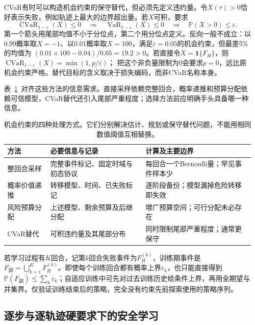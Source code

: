 CVaR有时可以构造机会约束的保守替代，但必须先定义违约量。令$X(\tau)>0$恰好表示失败，例如轨迹上最大的边界超出量。若$X$可积，要求
\[
  \operatorname{CVaR}_{1-\varepsilon}(X)\leq0
  \quad\Longrightarrow\quad
  \operatorname{VaR}_{1-\varepsilon}(X)\leq0
  \quad\Longrightarrow\quad
  \mathbb P(X>0)\leq\varepsilon.
\]
第一个箭头用尾部均值不小于分位点，第二个用分位点定义。反向一般不成立：以0.99概率取$X=-1$、以0.01概率取$X=100$，满足$\varepsilon=0.05$的机会约束，但最差5\%的均值为
$(0.01\times100-0.04)/0.05=19.2>0$。若直接令$X=\mathbf1\{F_H\}$，则
$\operatorname{CVaR}_{1-\varepsilon}(X)=\min(1,p/\varepsilon)$；
把这个非负量限制为0会要求$p=0$，远比原机会约束严格。替代目标的含义取决于损失编码，而非CVaR名称本身。

表~\ref{tab:rl-trustworthy-chance-methods}~对齐这些方法的信息需求。直接采样依赖完整回合，概率递推和预算分配依赖可信模型，CVaR替代还引入尾部严重程度；选择方法前应明确手头具备哪一种信息。

\begin{table}[htbp]
  \centering
  \begin{tabularx}{\linewidth}{@{}>{\raggedright\arraybackslash}p{21mm}XX@{}}
    \toprule
    方法 & 必要信息与记录 & 计算及主要边界 \\
    \midrule
    整回合采样 & 完整事件标记、固定时域与初态协议 & 每回合一个Bernoulli量；罕见事件样本少 \\
    概率价值递推 & 转移模型、时间、已失败标记 & 逐阶段备份；模型漏掉危险转移即失效 \\
    风险预算分配 & 上述模型、剩余预算及后继分配 & 增广预算空间；可行分配未必存在 \\
    CVaR替代 & 可积违约量及其尾部分布 & 同时限制尾部严重程度；通常更保守 \\
    \bottomrule
  \end{tabularx}
  \caption{机会约束的四种处理方式。它们分别解决估计、规划或保守替代问题，不能用相同数值阈值互相替换。}
  \label{tab:rl-trustworthy-chance-methods}
\end{table}

若学习过程有$K$回合，记第$k$回合失败事件为$F_H^{(k)}$，训练期事件是
$F_{\text{训}}=\bigcup_{k=1}^KF_H^{(k)}$。即使每个训练回合都有概率上界$\varepsilon_k$，也只能直接得到
$\mathbb P(F_{\text{训}})\leq\sum_k\varepsilon_k$；自适应训练中可先对过去训练历史给条件上界，再用全期望与并集界。仅验证训练结束后的策略，完全没有约束先前探索使用的策略序列。

\subsection{逐步与逐轨迹硬要求下的安全学习}
\label{sec:rl-trustworthy-hard-safety}

